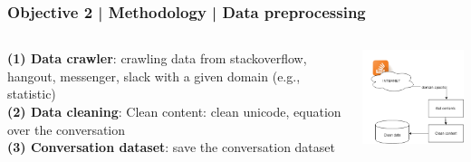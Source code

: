 \documentclass{beamer}
\begin{document}
\begin{frame}
\frametitle{Objective 2 | Methodology | Data preprocessing}



\begin{columns}
	
	\begin{column}{.55\textwidth}
\textbf{	(1) Data crawler}: crawling data from stackoverflow,\\ hangout, messenger, slack with a given domain (e.g., statistic)\\

\textbf{	(2) Data cleaning}: Clean content: clean unicode, equation over the conversation\\
\textbf{	(3) Conversation dataset}: save the conversation dataset\\
	\end{column}
	\begin{column}{.45\textwidth}
		\includegraphics[width=40mm]{dsf.png}
	\end{column}
	

\end{columns}
\begin{center}
	
\end{center}



\end{frame}
\end{document}
